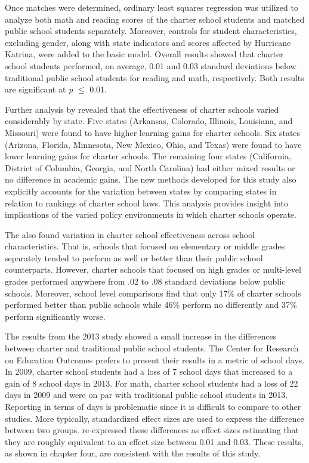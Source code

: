 \documentclass[letterpaper,12p,twoside]{article} %
\begin{document}
Once matches were determined, ordinary least squares regression was utilized to analyze both math and reading scores of the charter school students and matched public school students separately. Moreover, controls for student characteristics, excluding gender, along with state indicators and scores affected by Hurricane Katrina, were added to the basic model. Overall results showed that charter school students performed, on average, 0.01 and 0.03 standard deviations below traditional public school students for reading and math, respectively. Both results are significant at \textit{p} $\leq$ 0.01.

Further analysis by  revealed that the effectiveness of charter schools varied considerably by state. Five states (Arkansas, Colorado, Illinois, Louisiana, and Missouri) were found to have higher learning gains for charter schools. Six states (Arizona, Florida, Minnesota, New Mexico, Ohio, and Texas) were found to have lower learning gains for charter schools. The remaining four states (California, District of Columbia, Georgia, and North Carolina) had either mixed results or no difference in academic gains. The new methods developed for this study also explicitly accounts for the variation between states by comparing states in relation to rankings of charter school laws. This analysis provides insight into implications of the varied policy environments in which charter schools operate.

The  also found variation in charter school effectiveness across school characteristics. That is, schools that focused on elementary or middle grades separately tended to perform as well or better than their public school counterparts. However, charter schools that focused on high grades or multi-level grades performed anywhere from .02 to .08 standard deviations below public schools. Moreover, school level comparisons find that only 17\% of charter schools performed better than public schools while 46\% perform no differently and 37\% perform significantly worse.

The results from the 2013 study \cite{credo2013} showed a small increase in the differences between charter and traditional public school students. The Center for Research on Education Outcomes prefers to present their results in a metric of school days. In 2009, charter school students had a loss of 7 school days that increased to a gain of 8 school days in 2013. For math, charter school students had a loss of 22 days in 2009 and were on par with traditional public school students in 2013. Reporting in terms of days is problematic since it is difficult to compare to other studies. More typically, standardized effect sizes are used to express the difference between two groups.  re-expressed these differences as effect sizes estimating that they are roughly equivalent to an effect size between 0.01 and 0.03. These results, as shown in chapter four, are consistent with the results of this study. 
\end{document}
